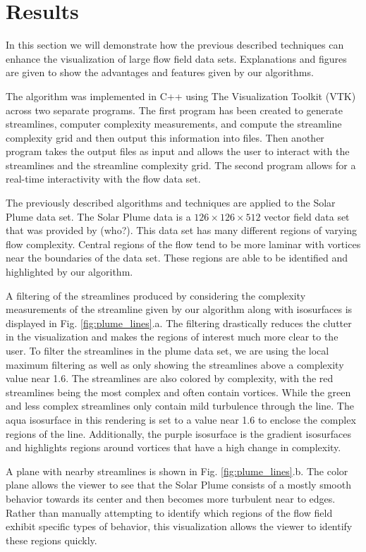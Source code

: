 \documentclass{egpubl}
\begin{document}
\section{Results} \label{sec:examples}

In this section we will demonstrate how the previous described techniques can enhance the visualization of large flow field data sets.
Explanations and figures are given to show the advantages and features given by our algorithms.

The algorithm was implemented in C++ using The Visualization Toolkit (VTK) across two separate programs.
The first program has been created to generate streamlines, computer complexity measurements, and compute the streamline complexity grid and then output this information into files.
Then another program takes the output files as input and allows the user to interact with the streamlines and the streamline complexity grid.
The second program allows for a real-time interactivity with the flow data set.

The previously described algorithms and techniques are applied to the Solar Plume data set.
The Solar Plume data is a $126 \times 126 \times 512$ vector field data set that was provided by (who?).
This data set has many different regions of varying flow complexity.
Central regions of the flow tend to be more laminar with vortices near the boundaries of the data set.
These regions are able to be identified and highlighted by our algorithm.

A filtering of the streamlines produced by considering the complexity measurements of the streamline given by our algorithm along with isosurfaces is displayed in Fig. \ref{fig:plume_lines}.a.
The filtering drastically reduces the clutter in the visualization and makes the regions of interest much more clear to the user.
To filter the streamlines in the plume data set, we are using the local maximum filtering as well as only showing the streamlines above a complexity value near 1.6.
The streamlines are also colored by complexity, with the red streamlines being the most complex and often contain vortices.
While the green and less complex streamlines only contain mild turbulence through the line.
The aqua isosurface in this rendering is set to a value near 1.6 to enclose the complex regions of the line.
Additionally, the purple isosurface is the gradient isosurfaces and highlights regions around vortices that have a high change in complexity.

A plane with nearby streamlines is shown in Fig. \ref{fig:plume_lines}.b.
The color plane allows the viewer to see that the Solar Plume consists of a mostly smooth behavior towards its center and then becomes more turbulent near to edges.
Rather than manually attempting to identify which regions of the flow field exhibit specific types of behavior, this visualization allows the viewer to identify these regions quickly.
\end{document}
